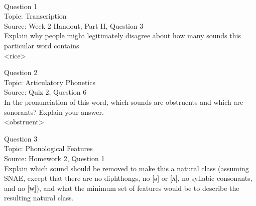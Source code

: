 \documentclass[12pt]{article}
\begin{document}
\newpage

\begin{center}
\textbf{{\color{red}{\HUGE END OF EXAM}}}\\

\end{center}
\newpage

\begin{center}
\textbf{{\color{blue}{\HUGE START OF EXAM\\}}}

\textbf{{\color{blue}{\HUGE Student ID: 82231\\}}}

\textbf{{\color{blue}{\HUGE \\}}}

\end{center}
\newpage

{\large Question 1}\\

Topic: Transcription\\
Source: Week 2 Handout, Part II, Question 3\\

Explain why people might legitimately disagree about how many sounds this particular word contains.\\

<rice>


\newpage

{\large Question 2}\\

Topic: Articulatory Phonetics\\
Source: Quiz 2, Question 6\\

In the pronunciation of this word, which sounds are obstruents and which are sonorants? Explain your answer.\\

<obstruent>


\newpage

{\large Question 3}\\

Topic: Phonological Features\\
Source: Homework 2, Question 1\\

Explain which sound should be removed to make this a natural class (assuming SNAE, except that there are no diphthongs, no [ə] or [ʌ], no syllabic consonants, and no [w̥]), and what the minimum set of features would be to describe the resulting natural class.\\
\end{document}
